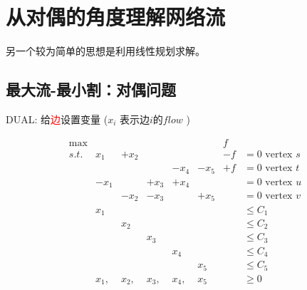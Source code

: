 \section{从对偶的角度理解网络流}
另一个较为简单的思想是利用线性规划求解。
\subsection{最大流-最小割：对偶问题}

\begin{figure}[H]
  \center
{}
\end{figure}

  {\sc DUAL}: 给\textcolor{red}{边}设置变量 ($x_i$ 表示边$i$的$flow$ )
\begin{small}
\[
\begin{array}{rrrrrrrl}
 \max &         &            &          &            &           &    f   &\\
 s.t.     & x_1  & +x_2 &           &            &           &-f   & = 0   \text{ vertex } s\\
        &        &             &           &    -x_4 & -x_5 &+f & = 0  \text{ vertex } t\\
        & -x_1&            & +x_3 &+x_4   &         &      & = 0  \text{ vertex } u\\
        &         &-x_2    & -x_3   &            &+x_5 &     & = 0  \text{ vertex } v\\
        & x_1  &           &            &            &          &     & \leq C_1 \\
        &   &   x_2        &            &            &          &     & \leq C_2 \\
        &        &           &  x_{3}          &            &          &     & \leq C_3 \\
        &        &           &            &      x_{4}      &          &     & \leq C_4 \\
        &        &           &            &            &   x_{5}       &     & \leq C_5 \\
        & x_1,  &  x_{2},         &   x_{3},         &    x_{4},        &  x_{5}        &     & \geq 0 \\
\end{array} \nonumber
\]
\end{small}

